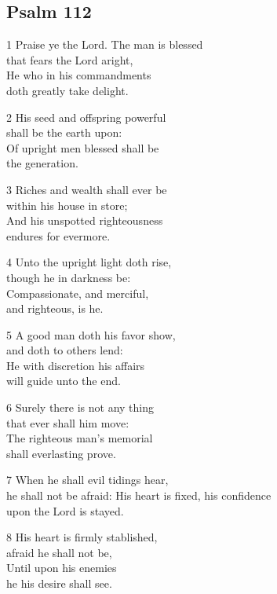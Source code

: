 \begin{center}
\quad{}\quad{}
\end{center}


\subsection*{Psalm 112}

1 Praise ye the Lord. The man is blessed\\
that fears the Lord aright,\\
He who in his commandments\\
doth greatly take delight.

2 His seed and offspring powerful\\
shall be the earth upon:\\
Of upright men blessed shall be\\
the generation.

3 Riches and wealth shall ever be\\
within his house in store;\\
And his unspotted righteousness\\
endures for evermore.

4 Unto the upright light doth rise,\\
though he in darkness be:\\
Compassionate, and merciful,\\
and righteous, is he.

5 A good man doth his favor show,\\
and doth to others lend:\\
He with discretion his affairs\\
will guide unto the end.

6 Surely there is not any thing\\
that ever shall him move:\\
The righteous man’s memorial\\
shall everlasting prove.

7 When he shall evil tidings hear,\\
he shall not be afraid:
His heart is fixed, his confidence\\
upon the Lord is stayed.

8 His heart is firmly stablished,\\
afraid he shall not be,\\
Until upon his enemies\\
he his desire shall see.

